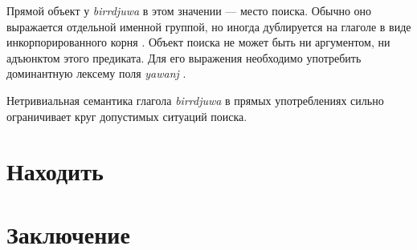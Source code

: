 Прямой объект у \textit{birrdjuwa} в этом значении --- место поиска. Обычно оно выражается отдельной именной группой, но иногда дублируется на глаголе в виде инкорпорированного корня . Объект поиска не может быть ни аргументом, ни адъюнктом этого предиката. Для его выражения необходимо употребить доминантную лексему поля \textit{yawanj} .

Нетривиальная семантика глагола \textit{birrdjuwa} в прямых употреблениях сильно ограничивает круг допустимых ситуаций поиска. 








\section{Находить}

\section{Заключение}

